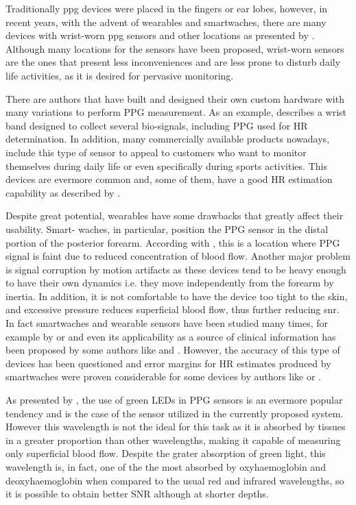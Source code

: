 Traditionally \ac{ppg} devices were placed in the fingers or ear lobes, however, in recent years, with the advent of wearables and smartwaches, there are many devices with wrist-worn \ac{ppg} sensors and other locations as presented by \citet{b_ppg_revisao}. Although many locations for the sensors have been proposed, wrist-worn sensors are the ones that present less inconveniences and are less prone to disturb daily life activities, as it is desired for pervasive monitoring.

There are authors that have built and designed their own custom hardware with many variations to perform PPG measurement. As an example, \citet{b_ppg_sensor} describes a wrist band designed to collect several bio-signals, including PPG used for HR determination. In addition, many commercially available products nowadays, include this type of sensor to appeal to customers who want to monitor themselves during daily life or even specifically during sports activities. This devices are evermore common and, some of them, have a good HR estimation capability as described by \citet{b_ppg_revisao2}.


Despite great potential, wearables have some drawbacks that greatly affect their usability. 
Smart- waches, in particular, position the PPG sensor in the distal portion of the posterior forearm. According with \citet{bvplee2016effective}, this is a location where PPG signal is faint due to reduced concentration of blood flow. Another major problem is signal corruption by motion artifacts as these devices tend to be heavy enough to have their own dynamics i.e. they move independently from the forearm by inertia. In addition, it is not comfortable to have the device too tight to the skin, and excessive pressure reduces superficial blood flow, thus further reducing \ac{snr}. In fact smartwaches and wearable sensors have been studied many times, for example by \citet{wearables} or \citet{sensor} and even its applicability as a source of clinical information has been proposed by some authors like \citet{compare, relogioarritmia} and \citet{doenca2}. However, the accuracy of this type of devices has been questioned and error margins for HR estimates produced by smartwaches were proven considerable for some devices by authors like \citet{compare, outroswearables} or \citet{compare2}.


As presented by \citet{b_ppg_revisao}, the use of green LEDs in PPG sensors is an evermore popular tendency and is the case of the sensor utilized in the currently proposed system. However this wavelength is not the ideal for this task as it is absorbed by tissues in a greater proportion than other wavelengths, making it capable of measuring only superficial blood flow. Despite the grater absorption of green light, this wavelength is, in fact, one of the the most absorbed by oxyhaemoglobin and deoxyhaemoglobin when compared to the usual red and infrared wavelengths, so it is possible to obtain better SNR although at shorter depths.

